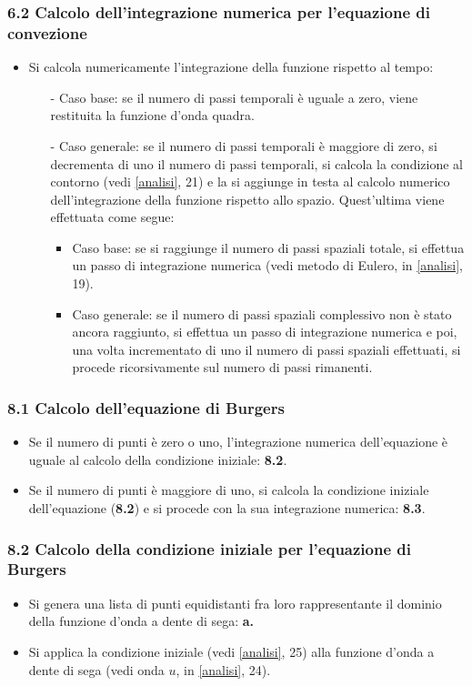 \subsubsection*{6.2 Calcolo dell'integrazione numerica per l'equazione di convezione}
\begin{itemize}
\item Si calcola numericamente l'integrazione della funzione rispetto al tempo:
\begin{itemize}
\item[-] Caso base: se il numero di passi temporali è uguale a zero, viene restituita la funzione d'onda quadra.
\item[-] Caso generale: se il numero di passi temporali è maggiore di zero, si decrementa di uno il numero di passi temporali, si calcola la condizione al contorno (vedi \ref{analisi}, 21)  e la si aggiunge in testa al calcolo numerico dell'integrazione della funzione rispetto allo spazio. Quest'ultima viene effettuata come segue:
\begin{itemize}
\item Caso base: se si raggiunge il numero di passi spaziali totale, si effettua un passo di integrazione numerica
(vedi metodo di Eulero, in \ref{analisi}, 19).
\item Caso generale: se il numero di passi spaziali complessivo non è stato ancora raggiunto, si effettua un passo di integrazione numerica e poi, una volta incrementato di uno il numero di passi spaziali effettuati, si procede ricorsivamente sul numero di passi rimanenti. 
\end{itemize}
\end{itemize}
\end{itemize}

\subsubsection*{8.1 Calcolo dell'equazione di Burgers}
\begin{itemize}
\item Se il numero di punti è zero o uno, l'integrazione numerica dell'equazione è uguale al calcolo della condizione iniziale: \textbf{8.2}.
\item Se il numero di punti è maggiore di uno, si calcola la condizione iniziale dell'equazione (\textbf{8.2}) e si procede con la sua integrazione numerica: \textbf{8.3}. 
\end{itemize}

\subsubsection*{8.2 Calcolo della condizione iniziale per l'equazione di Burgers}
\begin{itemize}
\item Si genera una lista di punti equidistanti fra loro rappresentante il dominio della funzione d'onda a dente di sega: \textbf{a.} 
\item Si applica la condizione iniziale (vedi \ref{analisi}, 25) alla funzione d'onda a dente di sega (vedi onda $u$, in \ref{analisi}, 24). 
\end{itemize}

